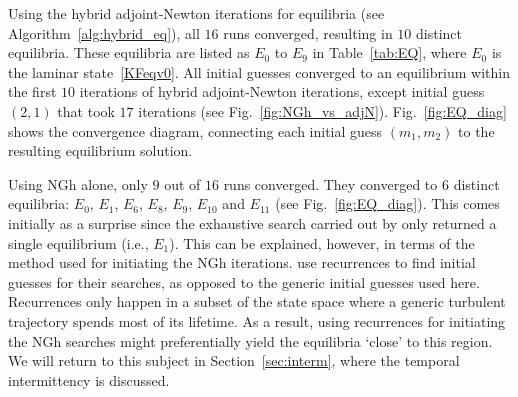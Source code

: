\documentclass{article}
\begin{document}
Using the hybrid adjoint-Newton iterations for equilibria (see Algorithm~\ref{alg:hybrid_eq}), all
$16$ runs converged, resulting in $10$ distinct equilibria. These equilibria are listed as $E_0$
to $E_9$ in Table~\ref{tab:EQ}, where $E_0$ is the laminar state~\eqref{KFeqv0}.
All initial guesses converged to an equilibrium within the first $10$ iterations
of hybrid adjoint-Newton iterations, except initial guess $(2,1)$ that took $17$ iterations
(see Fig.~\ref{fig:NGh_vs_adjN}). Fig.~\ref{fig:EQ_diag} shows the convergence diagram, connecting
each initial guess $(m_1,m_2)$ to the resulting equilibrium solution.

Using NGh alone, only $9$ out of $16$ runs converged. They converged to $6$ distinct
equilibria: $E_0$, $E_1$, $E_6$, $E_8$, $E_9$, $E_{10}$ and $E_{11}$
(see Fig.~\ref{fig:EQ_diag}).
This comes initially as a surprise since the exhaustive search carried out by only
returned
a single equilibrium (i.e., $E_1$).
This can be explained, however, in terms of the method used for initiating
the NGh iterations. \cite{CK13} use recurrences to find initial guesses for their searches, as
opposed to the generic initial guesses used here. Recurrences only happen in a subset of the
state space where a generic turbulent trajectory spends most of its lifetime.
As a result, using recurrences for initiating the NGh searches
might preferentially yield the equilibria `close' to this region.
We will return to this subject in Section~\ref{sec:interm}, where the temporal
intermittency is discussed.
%
\end{document}
